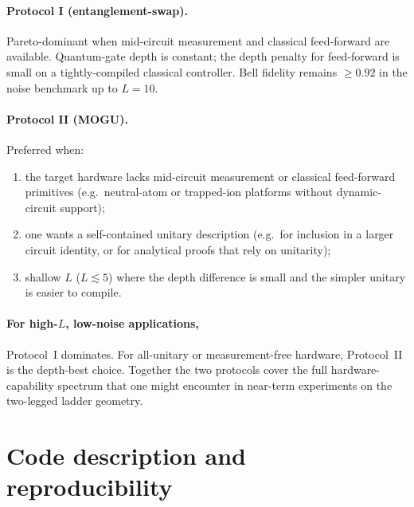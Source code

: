 \documentclass[11pt,a4paper]{article}
\theoremstyle{definition}
\begin{document}
\paragraph{Protocol I (entanglement-swap).} Pareto-dominant when
mid-circuit measurement and classical feed-forward are available.
Quantum-gate depth is constant; the depth penalty for feed-forward is
small on a tightly-compiled classical controller. Bell fidelity
remains $\ge 0.92$ in the noise benchmark up to $L=10$.

\paragraph{Protocol II (MOGU).} Preferred when:
\begin{enumerate}
\item the target hardware lacks mid-circuit measurement or classical
  feed-forward primitives (e.g.\ neutral-atom or trapped-ion platforms
  without dynamic-circuit support);
\item one wants a self-contained unitary description (e.g.\ for
  inclusion in a larger circuit identity, or for analytical proofs that
  rely on unitarity);
\item shallow $L$ ($L\lesssim 5$) where the depth difference is small
  and the simpler unitary is easier to compile.
\end{enumerate}

\paragraph{For high-$L$, low-noise applications,} Protocol~I dominates.
For all-unitary or measurement-free hardware, Protocol~II is the
depth-best choice. Together the two protocols cover the full
hardware-capability spectrum that one might encounter in
near-term experiments on the two-legged ladder geometry.

\section{Code description and reproducibility}
\end{document}
